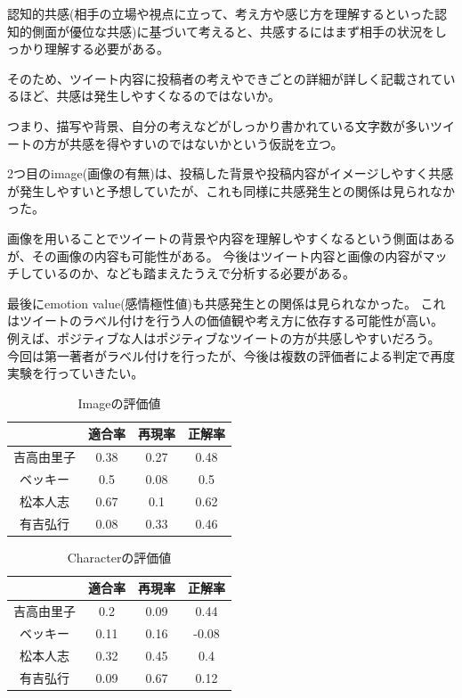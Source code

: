 \documentclass[dvipdfmx]{issj}
\begin{document}
認知的共感(相手の立場や視点に立って、考え方や感じ方を理解するといった認知的側面が優位な共感)に基づいて考えると、共感するにはまず相手の状況をしっかり理解する必要がある。

そのため、ツイート内容に投稿者の考えやできごとの詳細が詳しく記載されているほど、共感は発生しやすくなるのではないか。

つまり、描写や背景、自分の考えなどがしっかり書かれている文字数が多いツイートの方が共感を得やすいのではないかという仮説を立つ。


2つ目のimage(画像の有無)は、投稿した背景や投稿内容がイメージしやすく共感が発生しやすいと予想していたが、これも同様に共感発生との関係は見られなかった。

画像を用いることでツイートの背景や内容を理解しやすくなるという側面はあるが、その画像の内容も可能性がある。
今後はツイート内容と画像の内容がマッチしているのか、なども踏まえたうえで分析する必要がある。


最後にemotion value(感情極性値)も共感発生との関係は見られなかった。
これはツイートのラベル付けを行う人の価値観や考え方に依存する可能性が高い。
例えば、ポジティブな人はポジティブなツイートの方が共感しやすいだろう。
今回は第一著者がラベル付けを行ったが、今後は複数の評価者による判定で再度実験を行っていきたい。

\begin{table}[t]
  \begin{center}
    \caption{Imageの評価値}
    \begin{tabular}{c|ccc} \hline \hline
& 適合率 & 再現率 & 正解率 \\ \hline \hline
吉高由里子 &0.38&0.27&0.48 \\ \hline
ベッキー &0.5&0.08&0.5\\ \hline
松本人志 &0.67&0.1&0.62 \\ \hline
有吉弘行 & 0.08&0.33&0.46 \\ \hline
    \end{tabular}
    \label{tab:tripcode_user}
  \end{center}
\end{table}


\begin{table}[t]
  \begin{center}
    \caption{Characterの評価値}
    \begin{tabular}{c|ccc} \hline \hline
& 適合率 & 再現率 & 正解率 \\ \hline \hline
吉高由里子 &0.2&0.09&0.44 \\ \hline
ベッキー &0.11&0.16&-0.08\\ \hline
松本人志 &0.32&0.45&0.4\\ \hline
有吉弘行 & 0.09&0.67&0.12 \\ \hline
    \end{tabular}
    \label{tab:tripcode_user}
  \end{center}
\end{table}
\end{document}
